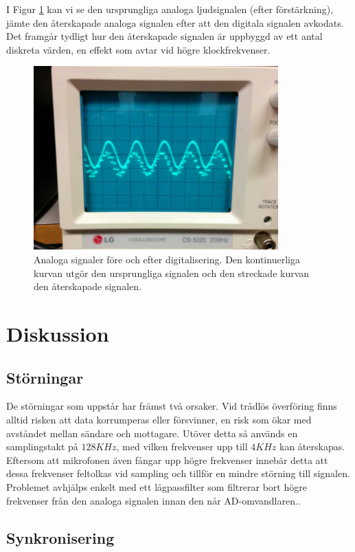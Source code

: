 \documentclass[a4paper,10pt]{article}
\begin{document}
I Figur \ref{oscilloskop} kan vi se den ursprungliga analoga ljudsignalen (efter 
förstärkning), jämte den återskapade analoga signalen efter att den digitala
signalen avkodats. Det framgår tydligt hur den återskapade signalen är uppbyggd 
av ett antal diskreta värden, en effekt som avtar vid högre klockfrekvenser.


\begin{figure}[h]
\centering
\includegraphics[width=0.84\textwidth]{oscilloskop.jpg}
\caption{Analoga signaler före och efter digitalisering. Den kontinuerliga 
         kurvan utgör den ursprungliga signalen och den streckade kurvan den 
	 återskapade signalen.}
\label{oscilloskop}
\end{figure}


\section{Diskussion}
\subsection{Störningar}
De störningar som uppstår har främst två orsaker. Vid trådlös överföring finns 
alltid risken att data korrumperas eller försvinner, en risk som ökar med 
avståndet mellan sändare och mottagare. Utöver detta så används en samplingstakt 
på $128 KHz$, med vilken frekvenser upp till $4 KHz$ kan återskapas. Eftersom 
att mikrofonen även fångar upp högre frekvenser innebär detta att dessa 
frekvenser feltolkas vid sampling och tillför en mindre störning till signalen. 
Problemet avhjälps enkelt med ett lågpassfilter som filtrerar bort högre 
frekvenser från den analoga signalen innan den når AD-omvandlaren..

\subsection{Synkronisering}
\label{synkronisering}
\end{document}
